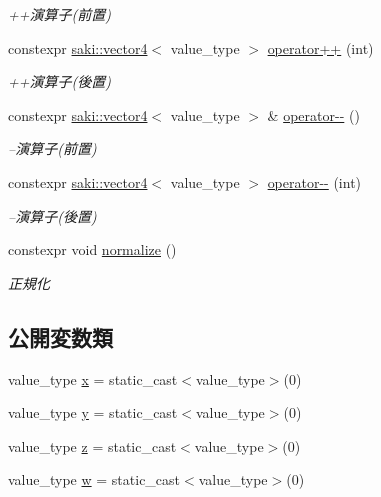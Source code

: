 \begin{DoxyCompactItemize}
\begin{DoxyCompactList}\small\item\em ++演算子(前置) \end{DoxyCompactList}\item 
constexpr \mbox{\hyperlink{classsaki_1_1vector4}{saki\+::vector4}}$<$ value\+\_\+type $>$ \mbox{\hyperlink{classsaki_1_1vector4_ab0ac68c756d4435af9255a9635dc33ed}{operator++}} (int)
\begin{DoxyCompactList}\small\item\em ++演算子(後置) \end{DoxyCompactList}\item 
constexpr \mbox{\hyperlink{classsaki_1_1vector4}{saki\+::vector4}}$<$ value\+\_\+type $>$ \& \mbox{\hyperlink{classsaki_1_1vector4_a602623df1870e123f03b8948f3f0f5df}{operator-\/-\/}} ()
\begin{DoxyCompactList}\small\item\em --演算子(前置) \end{DoxyCompactList}\item 
constexpr \mbox{\hyperlink{classsaki_1_1vector4}{saki\+::vector4}}$<$ value\+\_\+type $>$ \mbox{\hyperlink{classsaki_1_1vector4_af0937fd1074b0ab42f0c95ba1229817b}{operator-\/-\/}} (int)
\begin{DoxyCompactList}\small\item\em --演算子(後置) \end{DoxyCompactList}\item 
constexpr void \mbox{\hyperlink{classsaki_1_1vector4_a559bf8b322a0949cfe985ec82e32b2f4}{normalize}} ()
\begin{DoxyCompactList}\small\item\em 正規化 \end{DoxyCompactList}\end{DoxyCompactItemize}
\subsection*{公開変数類}
\begin{DoxyCompactItemize}
\item 
value\+\_\+type \mbox{\hyperlink{classsaki_1_1vector4_a8b2ff4254dd0ba142490c77927bfbf8e}{x}} = static\+\_\+cast$<$value\+\_\+type$>$(0)
\item 
value\+\_\+type \mbox{\hyperlink{classsaki_1_1vector4_a827cd630cd250d5fe85290f6671dbe0b}{y}} = static\+\_\+cast$<$value\+\_\+type$>$(0)
\item 
value\+\_\+type \mbox{\hyperlink{classsaki_1_1vector4_a42ece0235847ec6ee945516d4dc3ab48}{z}} = static\+\_\+cast$<$value\+\_\+type$>$(0)
\item 
value\+\_\+type \mbox{\hyperlink{classsaki_1_1vector4_a4db38b2a56279d65d701b14c21f7b073}{w}} = static\+\_\+cast$<$value\+\_\+type$>$(0)
\end{DoxyCompactItemize}


